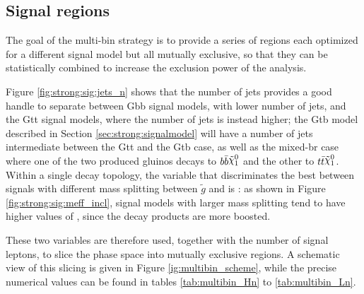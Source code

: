 \subsection*{Signal regions}

The goal of the multi-bin strategy is to provide a series of regions each optimized for a different signal model 
but all mutually exclusive, so that they can be statistically combined to increase the exclusion power of the analysis.

Figure \ref{fig:strong:sig:jets_n} shows that the number of jets provides a good handle to separate 
between Gbb signal models, with lower number of jets, and the Gtt signal models, where the number of jets is instead higher;
the Gtb model described in Section \ref{sec:strong:signalmodel} will have a number of jets intermediate between the Gtt and the Gtb case, 
as well as the mixed-\gls{br} case where one of the two produced gluinos decays to $b \bar{b} \ninoone$ and the other to 
$t \bar{t} \ninoone$.
Within a single decay topology, the variable that discriminates the best between signals with different mass splitting between $\tilde{g}$ and
\ninoone is \meff: as shown in Figure \ref{fig:strong:sig:meff_incl}, signal models with larger mass splitting tend to have higher values 
of \meff, since the decay products are more boosted. 

These two variables are therefore used, together with the number of signal leptons, to slice the phase space into mutually exclusive regions. 
A schematic view of this slicing is given in Figure \ref{ig:multibin_scheme}, while the precise numerical values can be found 
in tables \ref{tab:multibin_Hn} to \ref{tab:multibin_Ln}.




